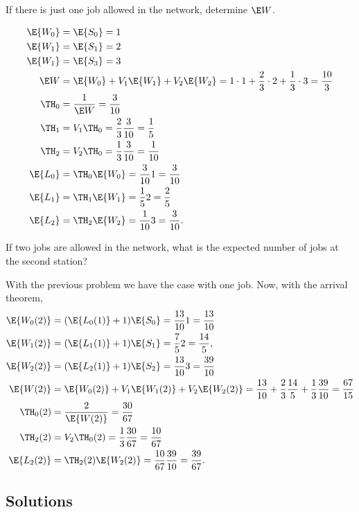 \begin{exercise}[201807]{1}
  If there is just one job allowed in the network, determine $\E W$.
\begin{solution}
    \begin{align*}
    \E{W_0} &= \E{S_0} = 1\\      
    \E{W_1} &= \E{S_1} = 2\\
    \E{W_1} &= \E{S_3} = 3\\
\E W &= \E{W_0} + V_1 \E{W_1} + V_2 \E{W_2} = 1\cdot 1 + \frac{2}{3}\cdot 2 +  \frac{1}{3} \cdot 3 = \frac{10}{3}\\
\TH_0 &= \frac{1}{\E W} = \frac{3}{10}\\
\TH_1&= V_1 \TH_0 = \frac{2}{3} \frac{3}{10}=\frac{1}{5}\\
\TH_2&= V_2 \TH_0 = \frac{1}{3} \frac{3}{10}=\frac{1}{10}\\
\E{L_0} &= \TH_0 \E{W_0} = \frac{3}{10} 1 = \frac{3}{10}\\
\E{L_1} &= \TH_1 \E{W_1} = \frac{1}{5} 2 = \frac{2}{5}\\
\E{L_2} &= \TH_2 \E{W_2} = \frac{1}{10} 3 = \frac{3}{10}.
    \end{align*}
\end{solution}

\end{exercise}

\begin{exercise}[201807]{2}
If two jobs are allowed in the network, what is the expected number of jobs at the second station?
\begin{solution}
    With the previous problem we have the case with one job. Now, with the arrival theorem,
    \begin{align*}
\E{W_{0}(2)} &= (\E{L_0(1)} + 1)\E{S_0} = \frac{13}{10} 1 = \frac{13}{10} \\
\E{W_{1}(2)} &= (\E{L_1(1)} + 1)\E{S_1} = \frac{7}{5} 2 = \frac{14}{5}, \\
\E{W_{2}(2)} &= (\E{L_2(1)} + 1)\E{S_2} = \frac{13}{10} 3 = \frac{39}{10} \\
\E{W(2)} &= \E{W_0(2)} + V_1 \E{W_1(2)} + V_2 \E{W_2(2)} = \frac{13}{10}+ \frac{2}{3}\frac{14}{5} +  \frac{1}{3}\frac{39}{10}=\frac{67}{15}\\
\TH_0(2) &= \frac{2}{\E{W(2)}} = \frac{30}{67}\\
\TH_2(2) &= V_2 \TH_0(2) = \frac{1}{3} \frac{30}{67}=\frac{10}{67}\\
\E{L_2(2)} &= \TH_2(2) \E{W_2(2)} = \frac{10}{67} \frac{39}{10} = \frac{39}{67}.
    \end{align*}

\end{solution}
\end{exercise}

\subsection*{Solutions}




